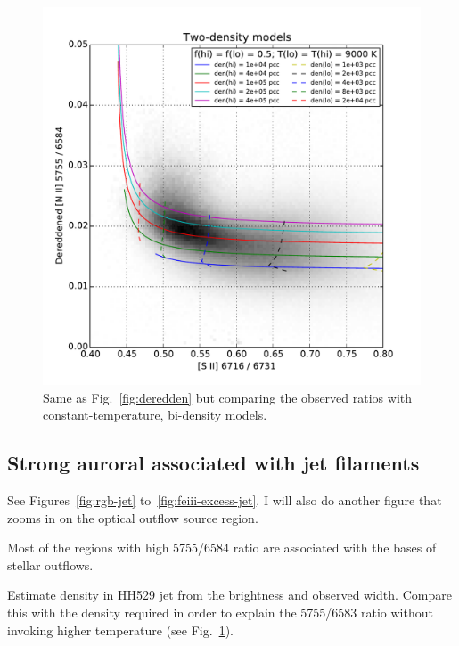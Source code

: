 \documentclass[preprint]{aastex}
\begin{document}
\begin{figure}
  \centering
  \includegraphics{nii-sii-ratios-two-phase}
  \caption{Same as Fig.~\ref{fig:deredden} but comparing the observed
    ratios with constant-temperature, bi-density models.}
  \label{fig:two-phase}
\end{figure}



\subsection{Strong auroral \nii{} associated with jet filaments}
\label{sec:jets}

See Figures~\ref{fig:rgb-jet} to~\ref{fig:feiii-excess-jet}.  I will
also do another figure that zooms in on the optical outflow source
region.  

Most of the regions with high 5755/6584 ratio are associated with the
bases of stellar outflows. 

Estimate density in HH529 jet from the \ha{} brightness and observed
width.  Compare this with the density required in order to explain the
5755/6583 ratio without invoking higher temperature (see
Fig.~\ref{fig:two-phase}).
\end{document}
